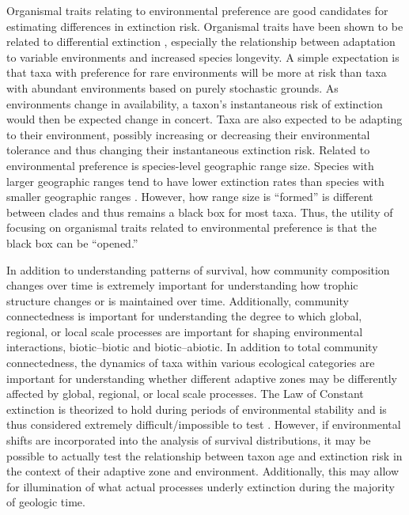 \documentclass[12pt,letterpaper]{article}
\begin{document}
Organismal traits relating to environmental preference are good candidates for estimating differences in extinction risk. Organismal traits have been shown to be related to differential extinction \citep{Foote2013,Liow2007b,Baumiller1993,Nurnberg2013a}, especially the relationship between adaptation to variable environments and increased species longevity. A simple expectation is that taxa with preference for rare environments will be more at risk than taxa with abundant environments based on purely stochastic grounds. As environments change in availability, a taxon's instantaneous risk of extinction would then be expected change in concert. Taxa are also expected to be adapting to their environment, possibly increasing or decreasing their environmental tolerance and thus changing their instantaneous extinction risk. Related to environmental preference is species-level geographic range size. Species with larger geographic ranges tend to have lower extinction rates than species with smaller geographic ranges \citep{Jablonski1986,Harnik2013,Nurnberg2013a,Jablonski2003,Roy2009c}. However, how range size is ``formed'' is different between clades \citep{Jablonski1987} and thus remains a black box for most taxa. Thus, the utility of focusing on organismal traits related to environmental preference is that the black box can be ``opened.''

In addition to understanding patterns of survival, how community composition changes over time is extremely important for understanding how trophic structure changes or is maintained over time. Additionally, community connectedness is important for understanding the degree to which global, regional, or local scale processes are important for shaping environmental interactions, biotic--biotic and biotic--abiotic. In addition to total community connectedness, the dynamics of taxa within various ecological categories are important for understanding whether different adaptive zones may be differently affected by global, regional, or local scale processes. The Law of Constant extinction is theorized to hold during periods of environmental stability and is thus considered extremely difficult/impossible to test \citep{Liow2011a}. However, if environmental shifts are incorporated into the analysis of survival distributions, it may be possible to actually test the relationship between taxon age and extinction risk in the context of their adaptive zone and environment. Additionally, this may allow for illumination of what actual processes underly extinction during the majority of geologic time. 
 
\end{document}
